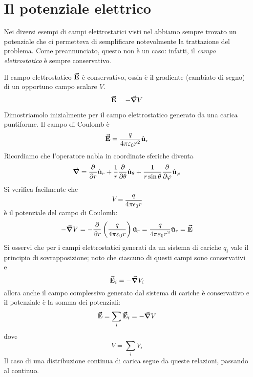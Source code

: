 \section{Il potenziale elettrico}
Nei diversi esempi di campi elettrostatici visti nel  abbiamo sempre trovato un potenziale che ci permetteva di semplificare notevolmente la trattazione del problema. Come preannunciato, questo non è un caso: infatti, il \textit{campo elettrostatico} è sempre conservativo.
\begin{theorema}
	Il campo elettrostatico $\vb*{\va{E}}$ è conservativo, ossia è il gradiente (cambiato di segno) di un opportuno campo scalare $V$.
	\begin{equation}
		\vb*{\va{E}}=-\grad{V}
	\end{equation}
\end{theorema}
\begin{demonstration}
	Dimostriamolo inizialmente per il campo elettrostatico generato da una carica puntiforme.
	Il campo di Coulomb è 
\begin{equation*}
	\vb*{\va{E}}=\frac{q}{4\pi\varepsilon_0r^2}\hat{\mathbf{u}}_r
\end{equation*}
Ricordiamo che l'operatore nabla in coordinate sferiche diventa
\begin{equation*}
	\grad =\pdv{r}\hat{\mathbf{u}}_r+\frac{1}{r}\pdv{\theta}\hat{\mathbf{u}}_\theta+\frac{1}{r\sin\theta}\pdv{\varphi}\hat{\mathbf{u}}_\varphi
\end{equation*}
Si verifica facilmente che
\begin{equation}
	V=\frac{q}{4\pi\epsilon_0r}
\end{equation}
è il potenziale del campo di Coulomb:
\begin{equation*}
	-\grad{V}=-\pdv{r}\left(\frac{q}{4\pi\varepsilon_0r}\right)\hat{\mathbf{u}}_r=\frac{q}{4\pi\varepsilon_0r^2}\hat{\mathbf{u}}_r=\vb*{\va{E}}
\end{equation*}
Si osservi che per i campi elettrostatici generati da un sistema di cariche $q_i$ vale il principio di sovrapposizione; noto che ciascuno di questi campi sono conservativi e
\begin{equation*}
	\vb*{\va{E}}_i=-\grad{V}_i
\end{equation*}
allora anche il campo complessivo generato dal sistema di cariche è conservativo e il potenziale è la somma dei potenziali:
\begin{equation}
	\vb*{\va{E}}=\sum_i\vb*{\va{E}}_i=-\grad{V}
\end{equation}
dove
\begin{equation}
	V=\sum_iV_i
\end{equation}
Il caso di una distribuzione continua di carica segue da queste relazioni, passando al continuo.
\end{demonstration}
